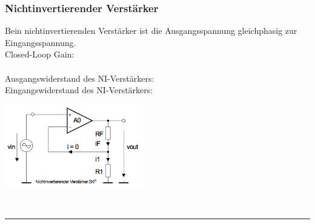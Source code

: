 		\subsubsection{Nichtinvertierender Verstärker }
			\begin{minipage}[T]{12cm}
            	Bein nichtinvertierenden Verstärker ist die Ausgangsspannung
            	gleichphasig zur Eingangsspannung.\\ Closed-Loop Gain:
            	\hspace{32mm}
            	\\
            	\hspace*{10mm}
            	\hspace{32mm}\\
            	Ausgangswiderstand des NI-Verstärkers: \\
            	Eingangswiderstand des NI-Verstärkers:
            	\hspace{1mm}
            \end{minipage}
			\begin{minipage}{6cm}
            	\includegraphics[width=6cm]{./bilder/ni-verstaerker.png}
            \end{minipage}\\

\hrule


